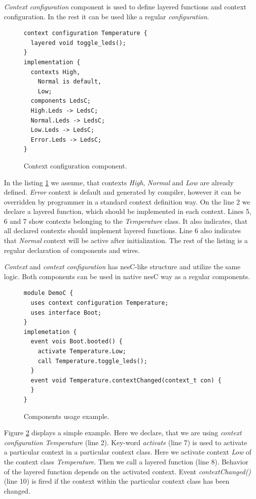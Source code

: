 \documentclass[12pt,a4paper]{article}
\begin{document}
\textit{Context configuration} component is used to define layered functions and context configuration. In the rest it can be used like a regular \textit{configuration}.

\begin{figure}[H]
\begin{lstlisting}
context configuration Temperature {
  layered void toggle_leds();
}
implementation {
  contexts High,
    Normal is default,
    Low;
  components LedsC;
  High.Leds -> LedsC;
  Normal.Leds -> LedsC;
  Low.Leds -> LedsC;
  Error.Leds -> LedsC;
}
\end{lstlisting}
\caption{Context configuration component.}
\label{fig:ccc}
\end{figure}

In the listing \ref{fig:ccc} we assume, that contexts \textit{High}, \textit{Normal} and \textit{Low} are already defined. \textit{Error} context is default and generated by compiler, however it can be overridden by programmer in a standard context definition way. On the line 2 we declare a layered function, which should be implemented in each context. Lines 5, 6 and 7 show contexts belonging to the \textit{Temperature} class. It also indicates, that all declared contexts should implement layered functions. Line 6 also indicates that \textit{Normal} context will be active after initialization. The rest of the listing is a regular declaration of components and wires.

\textit{Context} and \textit{context configuration} has nesC-like structure and utilize the same logic. Both components can be used in native nesC way as a regular components.

\begin{figure}[H]
\begin{lstlisting}
module DemoC {
  uses context configuration Temperature;
  uses interface Boot;
}
implemetation {
  event vois Boot.booted() {
    activate Temperature.Low;
    call Temperature.toggle_leds();
  }
  event void Temperature.contextChanged(context_t con) {
  }
}
\end{lstlisting}
\caption{Components usage example.}
\label{fig:cue}
\end{figure}

Figure \ref{fig:cue} displays a simple example. Here we declare, that we are using \textit{context configuration Temperature} (line 2). Key-word \textit{activate} (line 7) is used to activate a particular context in a particular context class. Here we activate context \textit{Low} of the context class \textit{Temperature}. Then we call a layered function (line 8). Behavior of the layered function depends on the activated context. Event \textit{contextChanged()} (line 10) is fired if the context within the particular context class has been changed.
\end{document}

